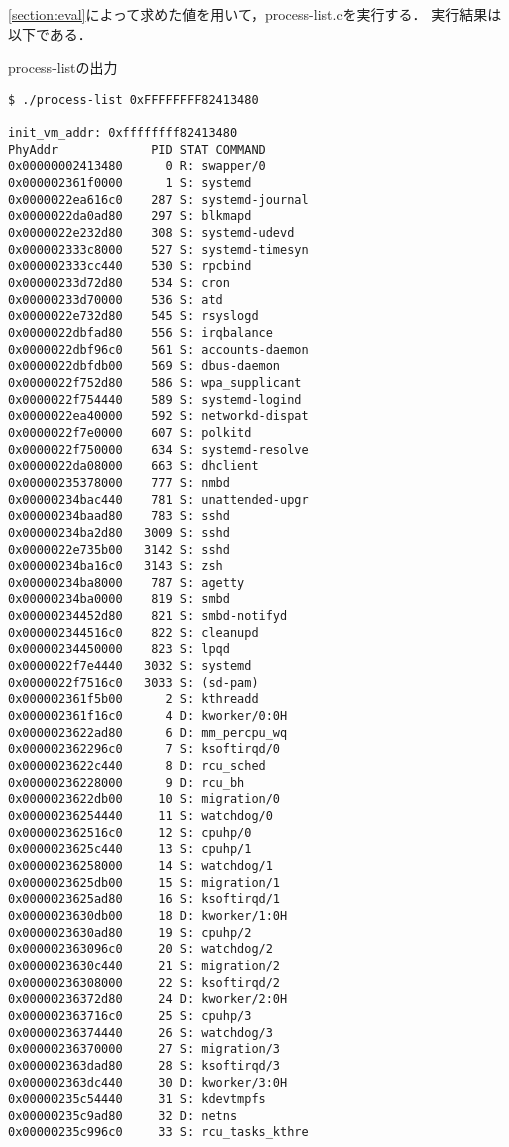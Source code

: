 \ref{section:eval}によって求めた値を用いて，process-list.cを実行する．
実行結果は以下である．

\begin{itembox}[l]{process-listの出力}
    \begin{verbatim}
$ ./process-list 0xFFFFFFFF82413480

init_vm_addr: 0xffffffff82413480
PhyAddr             PID STAT COMMAND
0x00000002413480      0 R: swapper/0
0x000002361f0000      1 S: systemd
0x0000022ea616c0    287 S: systemd-journal
0x0000022da0ad80    297 S: blkmapd
0x0000022e232d80    308 S: systemd-udevd
0x000002333c8000    527 S: systemd-timesyn
0x000002333cc440    530 S: rpcbind
0x00000233d72d80    534 S: cron
0x00000233d70000    536 S: atd
0x0000022e732d80    545 S: rsyslogd
0x0000022dbfad80    556 S: irqbalance
0x0000022dbf96c0    561 S: accounts-daemon
0x0000022dbfdb00    569 S: dbus-daemon
0x0000022f752d80    586 S: wpa_supplicant
0x0000022f754440    589 S: systemd-logind
0x0000022ea40000    592 S: networkd-dispat
0x0000022f7e0000    607 S: polkitd
0x0000022f750000    634 S: systemd-resolve
0x0000022da08000    663 S: dhclient
0x00000235378000    777 S: nmbd
0x00000234bac440    781 S: unattended-upgr
0x00000234baad80    783 S: sshd
0x00000234ba2d80   3009 S: sshd
0x0000022e735b00   3142 S: sshd
0x00000234ba16c0   3143 S: zsh
0x00000234ba8000    787 S: agetty
0x00000234ba0000    819 S: smbd
0x00000234452d80    821 S: smbd-notifyd
0x000002344516c0    822 S: cleanupd
0x00000234450000    823 S: lpqd
0x0000022f7e4440   3032 S: systemd
0x0000022f7516c0   3033 S: (sd-pam)
0x000002361f5b00      2 S: kthreadd
0x000002361f16c0      4 D: kworker/0:0H
0x0000023622ad80      6 D: mm_percpu_wq
0x000002362296c0      7 S: ksoftirqd/0
0x0000023622c440      8 D: rcu_sched
0x00000236228000      9 D: rcu_bh
0x0000023622db00     10 S: migration/0
0x00000236254440     11 S: watchdog/0
0x000002362516c0     12 S: cpuhp/0
0x0000023625c440     13 S: cpuhp/1
0x00000236258000     14 S: watchdog/1
0x0000023625db00     15 S: migration/1
0x0000023625ad80     16 S: ksoftirqd/1
0x0000023630db00     18 D: kworker/1:0H
0x0000023630ad80     19 S: cpuhp/2
0x000002363096c0     20 S: watchdog/2
0x0000023630c440     21 S: migration/2
0x00000236308000     22 S: ksoftirqd/2
0x00000236372d80     24 D: kworker/2:0H
0x000002363716c0     25 S: cpuhp/3
0x00000236374440     26 S: watchdog/3
0x00000236370000     27 S: migration/3
0x000002363dad80     28 S: ksoftirqd/3
0x000002363dc440     30 D: kworker/3:0H
0x00000235c54440     31 S: kdevtmpfs
0x00000235c9ad80     32 D: netns
0x00000235c996c0     33 S: rcu_tasks_kthre

\end{verbatim}
\end{itembox}
